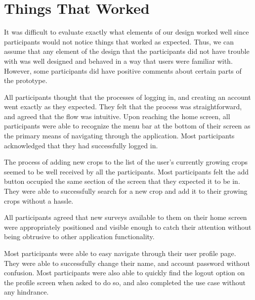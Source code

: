 \documentclass[12pt,letterpaper]{article}
\begin{document}
\clearpage
\section{Things That Worked}
It was difficult to evaluate exactly what elements of our design worked well since participants would not notice things that worked as expected. Thus, we can assume that any element of the design that the participants did not have trouble with was well designed and behaved in a way that users were familiar with. However, some participants did have positive comments about certain parts of the prototype.\par
All participants thought that the processes of logging in, and creating an account went exactly as they expected. They felt that the process was straightforward, and agreed that the flow was intuitive. Upon reaching the home screen, all participants were able to recognize the menu bar at the bottom of their screen as the primary means of navigating through the application. Most participants acknowledged that they had successfully logged in.\par
The process of adding new crops to the list of the user's currently growing crops seemed to be well received by all the participants. Most participants felt the add button occupied the same section of the screen that they expected it to be in. They were able to successfully search for a new crop and add it to their growing crops without a hassle.\par
All participants agreed that new surveys available to them on their home screen were appropriately positioned and visible enough to catch their attention without being obtrusive to other application functionality.\par
Most participants were able to easy navigate through their user profile page. They were able to successfully change their name, and account password without confusion. Most participants were also able to quickly find the logout option on the profile screen when asked to do so, and also completed the use case without any hindrance.

\clearpage
\end{document}
